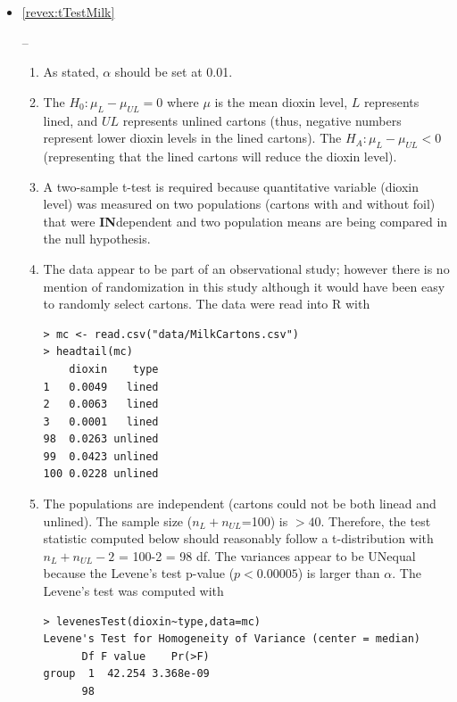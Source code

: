 \documentclass[10pt,openany]{book}\usepackage[]{graphicx}\usepackage[]{color}
\makeatletter
\newenvironment{kframe}{%
 \def\at@end@of@kframe{}%
 \ifinner\ifhmode%
  \def\at@end@of@kframe{\end{minipage}}%
  \begin{minipage}{\columnwidth}%
 \fi\fi%
 \def\FrameCommand##1{\hskip\@totalleftmargin \hskip-\fboxsep
 \colorbox{shadecolor}{##1}\hskip-\fboxsep
     \hskip-\linewidth \hskip-\@totalleftmargin \hskip\columnwidth}%
 \MakeFramed {\advance\hsize-\width
   \@totalleftmargin\z@ \linewidth\hsize
   \@setminipage}}%
 {\par\unskip\endMakeFramed%
 \at@end@of@kframe}
\newenvironment{knitrout}{}{} %
\makeatother
\begin{document}
\begin{itemize}
  \item \hypertarget{ans:tTestMilk}{\ref{revex:tTestMilk}} --
    \begin{enumerate}
      \item As stated, $\alpha$ should be set at 0.01.
      \item The $H_{0}:\mu_{L}-\mu_{UL}=0$ where $\mu$ is the mean dioxin level, $L$ represents lined, and $UL$ represents unlined cartons (thus, negative numbers represent lower dioxin levels in the lined cartons).  The $H_{A}:\mu_{L}-\mu_{UL}<0$ (representing that the lined cartons will reduce the dioxin level).
      \item A two-sample t-test is required because quantitative variable (dioxin level) was measured on two populations (cartons with and without foil) that were \textbf{IN}dependent and two population means are being compared in the null hypothesis.
      \item The data appear to be part of an observational study; however there is no mention of randomization in this study although it would have been easy to randomly select cartons.  The data were read into R with
\begin{knitrout}
\color{fgcolor}\begin{kframe}
\begin{verbatim}
> mc <- read.csv("data/MilkCartons.csv")
> headtail(mc)
    dioxin    type
1   0.0049   lined
2   0.0063   lined
3   0.0001   lined
98  0.0263 unlined
99  0.0423 unlined
100 0.0228 unlined
\end{verbatim}
\end{kframe}
\end{knitrout}
      \item The populations are independent (cartons could not be both linead and unlined).  The sample size ($n_{L}+n_{UL}$=100) is $>40$.  Therefore, the test statistic computed below should reasonably follow a t-distribution with $n_{L}+n_{UL}-2$ = 100-2 = 98 df.  The variances appear to be UNequal because the Levene's test p-value ($p<0.00005$) is larger than $\alpha$.  The Levene's test was computed with
\begin{knitrout}
\color{fgcolor}\begin{kframe}
\begin{verbatim}
> levenesTest(dioxin~type,data=mc)
Levene's Test for Homogeneity of Variance (center = median)
      Df F value    Pr(>F)
group  1  42.254 3.368e-09
      98                  

\end{verbatim}
\end{kframe}
\end{knitrout}
\end{enumerate}
\end{itemize}
\end{document}
